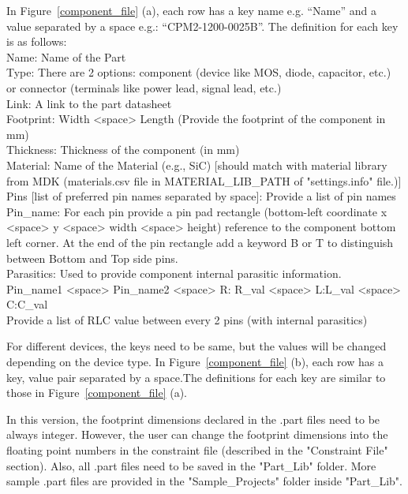 \documentclass[11pt]{article}
\begin{document}
\begin{enumerate}
In  Figure~\ref{component_file} (a), each row has a key name e.g. “Name” and a value separated by a space e.g.: “CPM2-1200-0025B”. The definition for each key is as follows:\\
    Name: Name of the Part\\
    Type: There are 2 options: component (device like MOS, diode, capacitor, etc.) or connector (terminals like power lead, signal lead, etc.)\\
    Link: A link to the part datasheet\\
    Footprint: Width <space> Length (Provide the footprint of the component in mm)\\
    Thickness: Thickness of the component (in mm)\\
    Material: Name of the Material (e.g., SiC) [should match with material library from MDK (materials.csv file in MATERIAL\_LIB\_PATH of "settings.info" file.)]\\
    Pins [list of preferred pin names separated by space]: Provide a list of pin names\\
    Pin\_name: For each pin provide a pin pad rectangle (bottom-left coordinate x <space> y <space> width <space> height) reference to the component bottom left corner. At the end of the pin rectangle add a keyword B or T to distinguish between Bottom and Top side pins.\\
    Parasitics: Used to provide component internal parasitic information.\\
	Pin\_name1 <space> Pin\_name2 <space> R: R\_val <space> L:L\_val <space> C:C\_val\\
	Provide a list of RLC value between every 2 pins (with internal parasitics)
	
	For different devices, the keys need to be same, but the values will be changed depending on the device type. 
	In  Figure~\ref{component_file} (b), each row has a key, value pair separated by a space.The definitions for each key are similar to those in  Figure~\ref{component_file} (a).
	
	In this version, the footprint dimensions declared in the .part files need to be always integer. However, the user can change the footprint dimensions into the floating point numbers in the constraint file (described in the "Constraint File" section). Also, all .part files need to be saved in the "Part\_Lib" folder. More sample .part files are provided in the "Sample\_Projects" folder inside "Part\_Lib".


\end{enumerate}
\end{document}
